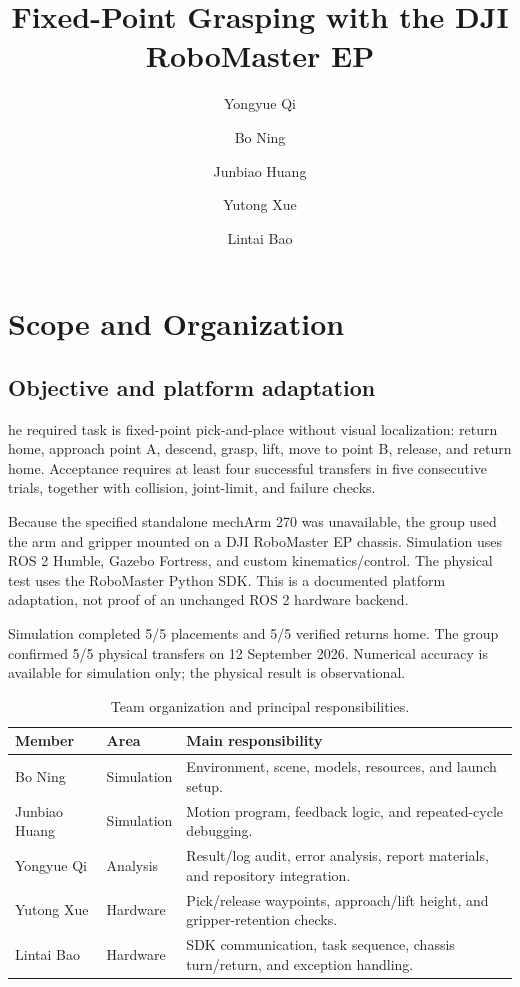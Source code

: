 \documentclass[9pt,a4paper,twocolumn,twoside]{tau-class/tau}
\title{Fixed-Point Grasping with the DJI RoboMaster EP}
\author[1]{Yongyue Qi}
\author[1]{Bo Ning}
\author[1]{Junbiao Huang}
\author[1]{Yutong Xue}
\author[1]{Lintai Bao}
\affil[1]{Group E5 (S16--S20), Robotics Integration Group Project I}
\begin{document}
\raggedbottom
\maketitle
\thispagestyle{firststyle}

\section{Scope and Organization}

\subsection{Objective and platform adaptation}
he required task is fixed-point pick-and-place without visual
localization: return home, approach point A, descend, grasp, lift, move to point
B, release, and return home. Acceptance requires at least four successful
transfers in five consecutive trials, together with collision, joint-limit, and
failure checks.

Because the specified standalone mechArm 270 was unavailable, the group used
the arm and gripper mounted on a DJI RoboMaster EP chassis. Simulation uses ROS
2 Humble, Gazebo Fortress, and custom kinematics/control. The physical test uses
the RoboMaster Python SDK. This is a documented platform adaptation, not proof
of an unchanged ROS 2 hardware backend.

\begin{info}
Simulation completed 5/5 placements and 5/5 verified returns home. The group
confirmed 5/5 physical transfers on 12 September 2026. Numerical accuracy is
available for simulation only; the physical result is observational.
\end{info}

\begin{table}[t]
\caption{Team organization and principal responsibilities.}
\label{tab:roles}
\centering
\begin{tabularx}{0.96\textwidth}{@{}p{31mm}p{28mm}Y@{}}
\toprule
\textbf{Member} & \textbf{Area} & \textbf{Main responsibility}\\
\midrule
Bo Ning & Simulation & Environment, scene, models, resources, and launch setup.\\
Junbiao Huang & Simulation & Motion program, feedback logic, and repeated-cycle debugging.\\
Yongyue Qi & Analysis & Result/log audit, error analysis, report materials, and repository integration.\\
Yutong Xue & Hardware & Pick/release waypoints, approach/lift height, and gripper-retention checks.\\
Lintai Bao & Hardware & SDK communication, task sequence, chassis turn/return, and exception handling.\\
\bottomrule
\end{tabularx}
\end{table}
\end{document}
